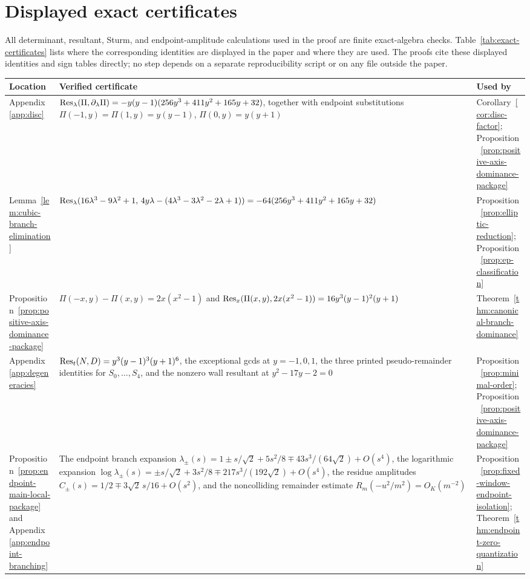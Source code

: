 \section{Displayed exact certificates}\label{app:reproducibility-note}

All determinant, resultant, Sturm, and endpoint-amplitude calculations used in the proof are finite exact-algebra checks.  Table~\ref{tab:exact-certificates} lists where the corresponding identities are displayed in the paper and where they are used.  The proofs cite these displayed identities and sign tables directly; no step depends on a separate reproducibility script or on any file outside the paper.

\begin{table}[H]
\centering
\small
\begin{tabular}{>{\raggedright\arraybackslash}p{}>{\raggedright\arraybackslash}p{}>{\raggedright\arraybackslash}p{}}
\toprule
Location & Verified certificate & Used by\\
\midrule
Appendix~\ref{app:disc} & \(\operatorname{Res}_\lambda(\Pi,\partial_\lambda\Pi)=-y(y-1)(256y^3+411y^2+165y+32)\), together with endpoint substitutions \(\Pi(-1,y)=\Pi(1,y)=y(y-1)\), \(\Pi(0,y)=y(y+1)\) & Corollary~\ref{cor:disc-factor}; Proposition~\ref{prop:positive-axis-dominance-package}\\
Lemma~\ref{lem:cubic-branch-elimination} & \(\operatorname{Res}_\lambda(16\lambda^3-9\lambda^2+1,\,4y\lambda-(4\lambda^3-3\lambda^2-2\lambda+1))=-64(256y^3+411y^2+165y+32)\) & Proposition~\ref{prop:elliptic-reduction}; Proposition~\ref{prop:ep-classification}\\
Proposition~\ref{prop:positive-axis-dominance-package} & \(\Pi(-x,y)-\Pi(x,y)=2x(x^2-1)\) and \(\operatorname{Res}_x(\Pi(x,y),2x(x^2-1))=16y^3(y-1)^2(y+1)\) & Theorem~\ref{thm:canonical-branch-dominance}\\
Appendix~\ref{app:degeneracies} & \(\operatorname{Res}_t(N,D)=y^3(y-1)^3(y+1)^6\), the exceptional gcds at \(y=-1,0,1\), the three printed pseudo-remainder identities for \(S_0,\ldots,S_4\), and the nonzero wall resultant at \(y^2-17y-2=0\) & Proposition~\ref{prop:minimal-order}; Proposition~\ref{prop:positive-axis-dominance-package}\\
Proposition~\ref{prop:endpoint-main-local-package} and Appendix~\ref{app:endpoint-branching} & The endpoint branch expansion \(\lambda_\pm(s)=1\pm s/\sqrt2+5s^2/8\mp43s^3/(64\sqrt2)+O(s^4)\), the logarithmic expansion \(\log\lambda_\pm(s)=\pm s/\sqrt2+3s^2/8\mp217s^3/(192\sqrt2)+O(s^4)\), the residue amplitudes \(C_\pm(s)=1/2\mp3\sqrt2\,s/16+O(s^2)\), and the noncolliding remainder estimate \(R_m(-u^2/m^2)=O_K(m^{-2})\) & Proposition~\ref{prop:fixed-window-endpoint-isolation}; Theorem~\ref{thm:endpoint-zero-quantization}\\

\end{tabular}
\end{table}
